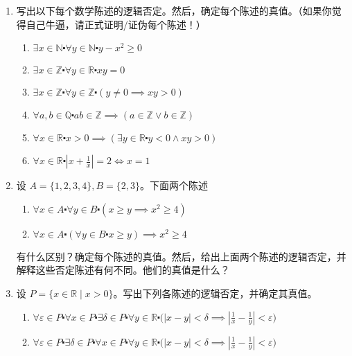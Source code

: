 \begin{enumerate}[label=(\arabic*)]
    \item 写出以下每个数学陈述的逻辑否定。然后，确定每个陈述的真值。（如果你觉得自己牛逼，请正式证明/证伪每个陈述！）
    \begin{enumerate}[label=(\alph*)]
        \item $\exists x \in \mathbb{N} \centerdot \forall y \in \mathbb{N} \centerdot y - x^2 \ge 0$
        \item $\exists x \in \mathbb{Z} \centerdot \forall y \in \mathbb{R} \centerdot xy = 0$
        \item $\exists x \in \mathbb{Z} \centerdot \forall y \in \mathbb{Z} \centerdot (y \ne 0 \implies xy > 0)$
        \item $\forall a, b \in \mathbb{Q} \centerdot ab \in \mathbb{Z} \implies (a \in \mathbb{Z} \lor b \in \mathbb{Z})$
        \item $\forall x \in \mathbb{R} \centerdot x > 0 \implies (\exists y \in \mathbb{R} \centerdot y < 0 \land xy > 0)$
        \item $\forall x \in \mathbb{R} \centerdot |x + \frac{1}{x}| = 2 \iff x = 1$
    \end{enumerate}
    \item 设 $A = \{1, 2, 3, 4\}, B = \{2, 3\}$。下面两个陈述
        \begin{enumerate}[label=(\alph*)]
            \item $\forall x \in A \centerdot \forall y \in B \centerdot (x \ge y \implies x^2 \ge 4)$
            \item $\forall x \in A \centerdot (\forall y \in B \centerdot x \ge y) \implies x^2 \ge 4$
        \end{enumerate}
        有什么区别？确定每个陈述的真值。然后，给出上面两个陈述的逻辑否定，并解释这些否定陈述有何不同。他们的真值是什么？
    \item 设 $P = \{x \in \mathbb{R} \mid x > 0\}$。写出下列各陈述的逻辑否定，并确定其真值。
        \begin{enumerate}[label=(\alph*)]
            \item $\forall \varepsilon \in P \centerdot \forall x \in P \centerdot \exists \delta \in P \centerdot \forall y \in \mathbb{R} \centerdot \Big(|x-y|<\delta \implies |\frac{1}{x} - \frac{1}{y}| < \varepsilon \Big)$
            \item $\forall \varepsilon \in P \centerdot \exists \delta \in P \centerdot \forall x \in P \centerdot \forall y \in \mathbb{R} \centerdot \Big(|x-y|<\delta \implies |\frac{1}{x} - \frac{1}{y}| < \varepsilon \Big)$

\end{enumerate}
\end{enumerate}
